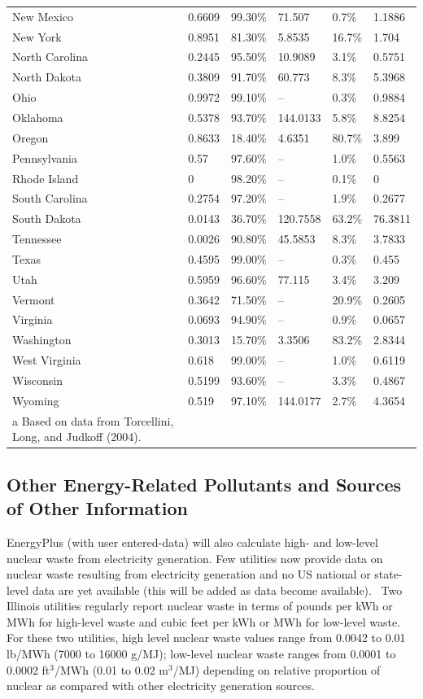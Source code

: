 \begin{longtable}[c]{p{1.0in}p{1.0in}p{1.0in}p{1.0in}p{1.0in}p{1.0in}}
New Mexico & 0.6609 & 99.30\% & 71.507 & 0.7\% & 1.1886 \tabularnewline
New York & 0.8951 & 81.30\% & 5.8535 & 16.7\% & 1.704 \tabularnewline
North Carolina & 0.2445 & 95.50\% & 10.9089 & 3.1\% & 0.5751 \tabularnewline
North Dakota & 0.3809 & 91.70\% & 60.773 & 8.3\% & 5.3968 \tabularnewline
Ohio & 0.9972 & 99.10\% & -- & 0.3\% & 0.9884 \tabularnewline
Oklahoma & 0.5378 & 93.70\% & 144.0133 & 5.8\% & 8.8254 \tabularnewline
Oregon & 0.8633 & 18.40\% & 4.6351 & 80.7\% & 3.899 \tabularnewline
Pennsylvania & 0.57 & 97.60\% & -- & 1.0\% & 0.5563 \tabularnewline
Rhode Island & 0 & 98.20\% & -- & 0.1\% & 0 \tabularnewline
South Carolina & 0.2754 & 97.20\% & -- & 1.9\% & 0.2677 \tabularnewline
South Dakota & 0.0143 & 36.70\% & 120.7558 & 63.2\% & 76.3811 \tabularnewline
Tennessee & 0.0026 & 90.80\% & 45.5853 & 8.3\% & 3.7833 \tabularnewline
Texas & 0.4595 & 99.00\% & -- & 0.3\% & 0.455 \tabularnewline
Utah & 0.5959 & 96.60\% & 77.115 & 3.4\% & 3.209 \tabularnewline
Vermont & 0.3642 & 71.50\% & -- & 20.9\% & 0.2605 \tabularnewline
Virginia & 0.0693 & 94.90\% & -- & 0.9\% & 0.0657 \tabularnewline
Washington & 0.3013 & 15.70\% & 3.3506 & 83.2\% & 2.8344 \tabularnewline
West Virginia & 0.618 & 99.00\% & -- & 1.0\% & 0.6119 \tabularnewline
Wisconsin & 0.5199 & 93.60\% & -- & 3.3\% & 0.4867 \tabularnewline
Wyoming & 0.519 & 97.10\% & 144.0177 & 2.7\% & 4.3654 \tabularnewline
a Based on data from Torcellini, Long, and Judkoff (2004). \tabularnewline
\bottomrule
\end{longtable}

\subsection{Other Energy-Related Pollutants and Sources of Other Information}\label{other-energy-related-pollutants-and-sources-of-other-information}

EnergyPlus (with user entered-data) will also calculate high- and low-level nuclear waste from electricity generation. Few utilities now provide data on nuclear waste resulting from electricity generation and no US national or state-level data are yet available (this will be added as data become available).~ Two Illinois utilities regularly report nuclear waste in terms of pounds per kWh or MWh for high-level waste and cubic feet per kWh or MWh for low-level waste.~ For these two utilities, high level nuclear waste values range from 0.0042 to 0.01 lb/MWh (7000 to 16000 g/MJ); low-level nuclear waste ranges from 0.0001 to 0.0002 ft\(^{3}\)/MWh (0.01 to 0.02 m\(^{3}\)/MJ) depending on relative proportion of nuclear as compared with other electricity generation sources.

